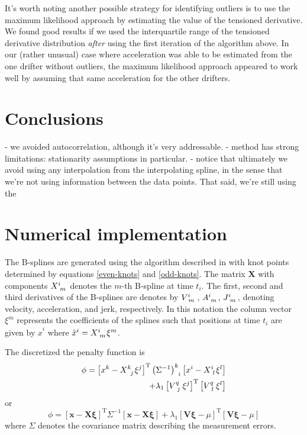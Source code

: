 \documentclass[10pt,journal]{IEEEtran}
\begin{document}
It's worth noting another possible strategy for identifying outliers is to use the maximum likelihood approach by estimating the value of the tensioned derivative. We found good results if we used the interquartile range of the tensioned derivative distribution \emph{after} using the first iteration of the algorithm above. In our (rather unusual) case where acceleration was able to be estimated from the one drifter without outliers, the maximum likelihood approach appeared to work well by assuming that same acceleration for the other drifters.

\section{Conclusions}

- we avoided autocorrelation, although it's very addressable.
- method has strong limitations: stationarity assumptions in particular.
- notice that ultimately we avoid using any interpolation from the interpolating spline, in the sense that we're not using information between the data points. That said, we're still using the 

%
\appendices
%

\section{Numerical implementation}
\label{sec:numerical_implementation}

The B-splines are generated using the algorithm described in \cite{deboor1978-book} with knot points determined by equations \ref{even-knots} and \ref{odd-knots}. The matrix $\mathbf{X}$ with components $X\indices{^i_m}$ denotes the $m$-th B-spline at time $t_i$. The first, second and third derivatives of the B-splines are denotes by $V\indices{^i_m}$, $A\indices{^i_m}$, $J\indices{^i_m}$, denoting velocity, acceleration, and jerk, respectively. In this notation the column vector $\xi^m$ represents the coefficients of the splines such that positions at time $t_i$ are given by $\hat{x}^i$ where $\hat{x}^i =  X\indices{^i_m} \xi^m$.

The discretized the penalty function is
\begin{equation}
\begin{split}
\phi = \left[ x^k - X\indices{^k_j} \xi^j \right]^{\textrm{T}} \left(\Sigma^{-1}\right)\indices{^k_i} \left[ x^i - X\indices{^i_l} \xi^l \right] \\
+ \lambda_1 \left[V\indices{^q_j} \xi^j \right]^{\textrm{T}} \left[ V\indices{^q_l} \xi^l \right]
\end{split}
\end{equation}
or
\begin{equation}
\phi = \left[ \mathbf{x} - \mathbf{X} \mathbf{\xi} \right]^{\textrm{T}} \Sigma^{-1} \left[ \mathbf{x} - \mathbf{X} \mathbf{\xi}\right]
+ \lambda_1 \left[\mathbf{V}\mathbf{\xi} - \mu \right]^{\textrm{T}} \left[ \mathbf{V}\mathbf{\xi} - \mu \right]
\end{equation}
where $\Sigma$ denotes the covariance matrix describing the measurement errors.
\end{document}
